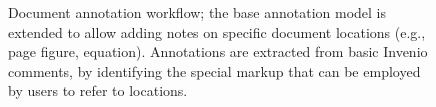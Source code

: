 \begin{figure}[!ht]
  \centering
  \caption[Document annotation workflow]
          {Document annotation workflow; the base annotation model is extended
           to allow adding notes on specific document locations (e.g., page
           figure, equation). Annotations are extracted from basic Invenio
           comments, by identifying the special markup that can be employed by
           users to refer to locations.}
  \label{fig:docanno}
\end{figure}

